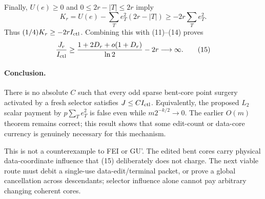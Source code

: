 Finally, $U(e)\ge0$ and $0\le2r-|T|\le2r$ imply
\[
 K_r=U(e)-\sum_Te_T^2(2r-|T|)\ge-2r\sum_Te_T^2.
\]
Thus $(1/4)K_r\ge-2rI_{\rm ctl}$.  Combining this with
(11)--(14) proves
\[
 {J_r\over I_{\rm ctl}}
 \ge {1+2D_r+o(1+D_r)\over\ln2}-2r\longrightarrow\infty.\tag{15}
\]

\paragraph{Conclusion.}
There is no absolute $C$ such that every odd sparse bent-core point surgery
activated by a fresh selector satisfies $J\le C I_{\rm ctl}$.  Equivalently,
the proposed $L_2$ scalar payment by $p\sum_Te_T^2$ is false even while
$m2^{-k/2}\to0$.  The earlier $O(m)$ theorem remains correct; this result
shows that some edit-count or data-core currency is genuinely necessary for
this mechanism.

This is not a counterexample to FEI or GU'.  The edited bent cores carry
physical data-coordinate influence that (15) deliberately does not charge.
The next viable route must debit a single-use data-edit/terminal packet, or
prove a global cancellation across descendants; selector influence alone
cannot pay arbitrary changing coherent cores.
